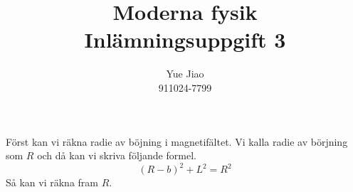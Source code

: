 \documentclass[a4paper,12pt]{article}
\author{Yue Jiao \\ 911024-7799}
\title{ {\Large \textbf{ Moderna fysik \\ Inlämningsuppgift 3} }}
\date{}
\begin{document}
\maketitle
Först kan vi räkna radie av böjning i magnetifältet. 
Vi kalla radie av börjning som $R$ och då kan vi skriva följande formel.
$$
(R-b)^2 + L^2 = R^2
$$
Så kan vi räkna fram $R$. 
\end{document}

